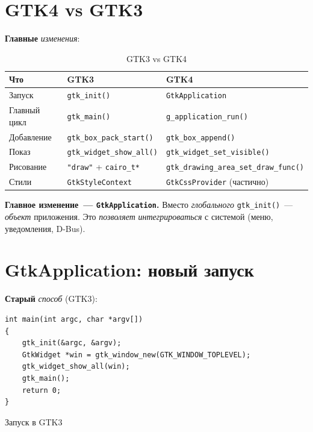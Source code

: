 \section{GTK4 vs GTK3}
\label{sec:gtk4-vs-gtk3}

\textbf{Главные} \emph{изменения}:

\begin{table}[htbp]
\centering
\caption{GTK3 vs GTK4}
\label{tab:gtk4-vs-gtk3}
\small
\begin{tabularx}{\textwidth}{@{}l L L@{}}
\toprule
\textbf{Что} & \textbf{GTK3} & \textbf{GTK4} \\
\midrule
Запуск       & \texttt{gtk\_init()} & \texttt{GtkApplication} \\
Главный цикл & \texttt{gtk\_main()} & \texttt{g\_application\_run()} \\
Добавление   & \texttt{gtk\_box\_pack\_start()} & \texttt{gtk\_box\_append()} \\
Показ        & \texttt{gtk\_widget\_show\_all()} & \texttt{gtk\_widget\_set\_visible()} \\
Рисование    & \texttt{"draw"} + \texttt{cairo\_t*} & \texttt{gtk\_drawing\_area\_set\_draw\_func()} \\
Стили        & \texttt{GtkStyleContext} & \texttt{GtkCssProvider} (частично) \\
\bottomrule
\end{tabularx}
\end{table}

\begin{keybox}
\textbf{Главное изменение~--- \texttt{GtkApplication}.} Вместо
\emph{глобального} \texttt{gtk\_init()}~--- \emph{объект}
приложения. Это \emph{позволяет} \emph{интегрироваться}
с системой (меню, уведомления, D-Bus).
\end{keybox}

\section{GtkApplication: новый запуск}
\label{sec:gtk4-application}

\textbf{Старый} \emph{способ} (GTK3):
\begin{listing}[htbp]
\begin{verbatim}
int main(int argc, char *argv[])
{
    gtk_init(&argc, &argv);
    GtkWidget *win = gtk_window_new(GTK_WINDOW_TOPLEVEL);
    gtk_widget_show_all(win);
    gtk_main();
    return 0;
}
\end{verbatim}
\caption{Запуск в GTK3}
\label{lst:gtk3-main}
\end{listing}

